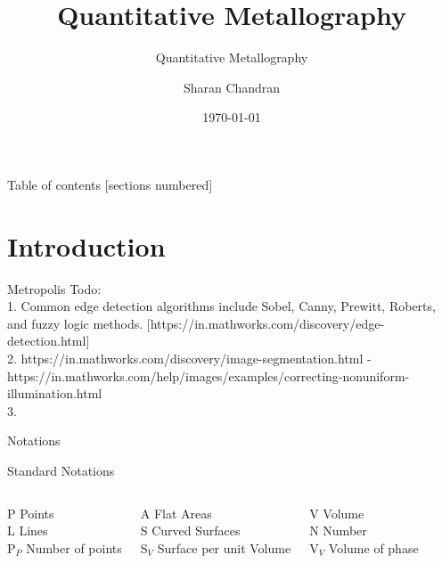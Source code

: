 \documentclass[10pt]{beamer}
\title{Quantitative Metallography}
\subtitle{Quantitative Metallography}
\date{\today}
\date{}
\author{Sharan Chandran}
\institute{Indian Institute of Science}
\begin{document}
\maketitle

\begin{frame}{Table of contents}
  [sections numbered]
  \tableofcontents[hideallsubsections]
\end{frame}

\section{Introduction}

\begin{frame}[fragile]{Metropolis}
Todo: \\
1. Common edge detection algorithms include Sobel, Canny, Prewitt, Roberts, and fuzzy logic methods. [https://in.mathworks.com/discovery/edge-detection.html] \\
2. https://in.mathworks.com/discovery/image-segmentation.html - https://in.mathworks.com/help/images/examples/correcting-nonuniform-illumination.html \\
3. 
\end{frame}


\begin{frame}{Notations}

\begin{block}{Standard Notations}
\hspace{1em}
  \begin{columns}[T,onlytextwidth]
    P Points \\
    L Lines  \\
    P$ _{P} $ Number of points
  
 
   A Flat Areas \\
   S Curved Surfaces \\
   S$ _{V} $ Surface per unit Volume
  
    V Volume \\
    N Number \\
    V$ _{V} $ Volume of phase
\end{columns} 
    
\end{block}

\end{frame}
\end{document}

